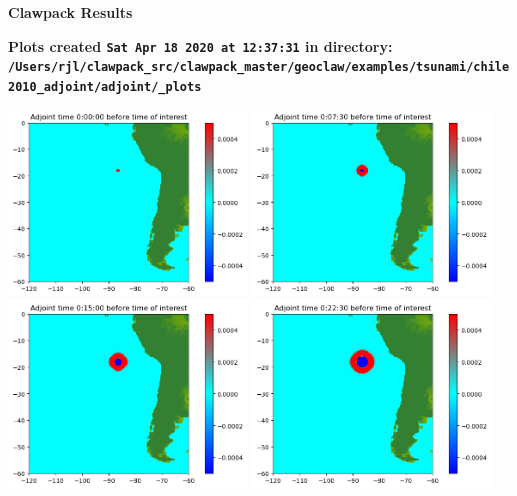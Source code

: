 \documentclass[11pt]{article}
\begin{document}
        \begin{center}{\Large\bf Clawpack Results}\vskip 5pt
        
        \bf Plots created {\tt Sat Apr 18 2020 at 12:37:31} in directory: \vskip 5pt
        \verb+/Users/rjl/clawpack_src/clawpack_master/geoclaw/examples/tsunami/chile2010_adjoint/adjoint/_plots+
        \end{center}
        \vskip 5pt
        \includegraphics[width=0.475\textwidth]{frame0000fig0.png}
\vskip 10pt 
\includegraphics[width=0.475\textwidth]{frame0001fig0.png}
\vskip 10pt 
\includegraphics[width=0.475\textwidth]{frame0002fig0.png}
\vskip 10pt 
\includegraphics[width=0.475\textwidth]{frame0003fig0.png}
\end{document}
